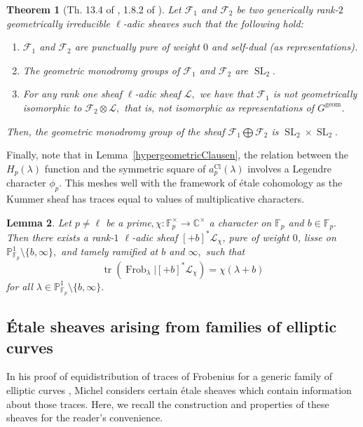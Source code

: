\documentclass[12pt]{amsart}
\newtheorem{theorem}{Theorem}[section]
\newtheorem{lemma}[theorem]{Lemma}
\theoremstyle{definition}
\theoremstyle{remark}
\numberwithin{equation}{section}
\def\C{\mathbb C}
\def\F{{\mathbb F}}
\def\C{\mathbb{C}}
\def\F{\mathbb{F}}
\DeclareMathOperator{\Frob}{Frob}
\DeclareMathOperator{\tr}{tr}
\DeclareMathOperator{\geom}{geom}
\DeclareMathOperator{\SL}{SL}
\DeclareMathOperator{\Cl}{Cl}
\begin{document}
\begin{theorem}[Th. 13.4 of \cite{AppliedladicCohomology}, 1.8.2 of \cite{KatzESDE}]\label{GKRCriterion}
    Let $\mathcal{F}_1$ and $\mathcal{F}_2$ be two generically rank-$2$ geometrically irreducible $\ell$-adic sheaves such that the following hold:
    \begin{enumerate}
        \item $\mathcal{F}_1$ and $\mathcal{F}_2$ are punctually pure of weight $0$ and self-dual (as representations).
        \item The geometric monodromy groups of $\mathcal{F}_1$ and $\mathcal{F}_2$ are $\SL_2.$
        \item For any rank one sheaf $\ell$-adic sheaf $\mathcal{L},$ we have that $\mathcal{F}_1$ is not geometrically isomorphic to $\mathcal{F}_2\otimes\mathcal{L},$ that is, not isomorphic as representations of $G^{\geom}$.
    \end{enumerate}
    Then, the geometric monodromy group of the sheaf $\mathcal{F}_1\bigoplus\mathcal{F}_2$ is $\SL_2\times\SL_2.$
\end{theorem}


Finally, note that in Lemma~\ref{hypergeometricClausen}, the relation between the $H_p(\lambda)$ function and the symmetric square of $a_p^{\Cl}(\lambda)$ involves a Legendre character $\phi_p.$ This meshes well with the framework of \'etale cohomology as the Kummer sheaf has traces equal to values of multiplicative characters. 

\begin{lemma}\cite[Section 3.4 and Example 4.2.2]{AppliedladicCohomology}\label{KummerSheafLemma}
    Let $p\neq \ell$ be a prime$ ,\chi:\F_p^\times\to\C^\times$ a character on $\F_p$ and $b\in\F_p.$ Then there exists a rank-$1$ $\ell$-adic sheaf $[+b]^\ast\mathcal{L}_{\chi}$, pure of weight $0$, lisse on $\mathbb{P}_{\F_p}^1\setminus\{b,\infty\},$ and tamely ramified at $b$ and $\infty,$ such that
    $$
    \tr(\Frob_\lambda|[+b]^\ast\mathcal{L}_\chi) = \chi(\lambda+b)
    $$
    for all $\lambda\in\mathbb{P}_{\F_p}^1\setminus\{b,\infty\}.$
\end{lemma}

\subsection{\'Etale sheaves arising from families of elliptic curves}\label{EtaleSheafFEC}

In his proof of equidistribution of traces of Frobenius for a generic family of elliptic curves \cite[Section 3]{RangMoyen}, Michel considers certain \'etale sheaves which contain information about those traces. Here, we recall the construction and properties of these sheaves for the reader's convenience.
\end{document}
